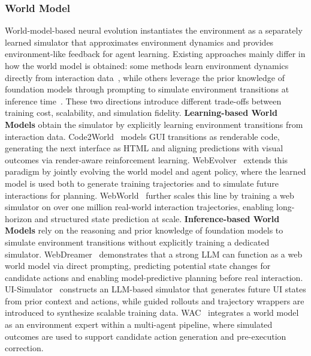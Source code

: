 \documentclass{llmxive}
\begin{document}
\subsubsection{World Model}\label{sec:world_model}
World-model-based neural evolution instantiates the environment as a separately learned simulator that approximates environment dynamics and provides environment-like feedback for agent learning.
%
Existing approaches mainly differ in how the world model is obtained: some methods learn environment dynamics directly from interaction data~\cite{Code2World,WebEvolver,WebWorld}, while others leverage the prior knowledge of foundation models through prompting to simulate environment transitions at inference time~\cite{WebDreamer,UI-Simulator,WAC}.
These two directions introduce different trade-offs between training cost, scalability, and simulation fidelity.
%
\textbf{Learning-based World Models} obtain the simulator by explicitly learning environment transitions from interaction data.
Code2World~\cite{Code2World} models GUI transitions as renderable code, generating the next interface as HTML and aligning predictions with visual outcomes via render-aware reinforcement learning.
WebEvolver~\cite{WebEvolver} extends this paradigm by jointly evolving the world model and agent policy, where the learned model is used both to generate training trajectories and to simulate future interactions for planning.
WebWorld~\cite{WebWorld} further scales this line by training a web simulator on over one million real-world interaction trajectories, enabling long-horizon and structured state prediction at scale.
%
\textbf{Inference-based World Models} rely on the reasoning and prior knowledge of foundation models to simulate environment transitions without explicitly training a dedicated simulator.
WebDreamer~\cite{WebDreamer} demonstrates that a strong LLM can function as a web world model via direct prompting, predicting potential state changes for candidate actions and enabling model-predictive planning before real interaction.
UI-Simulator~\cite{UI-Simulator} constructs an LLM-based simulator that generates future UI states from prior context and actions, while guided rollouts and trajectory wrappers are introduced to synthesize scalable training data.
WAC~\cite{WAC} integrates a world model as an environment expert within a multi-agent pipeline, where simulated outcomes are used to support candidate action generation and pre-execution correction.
%
\end{document}
